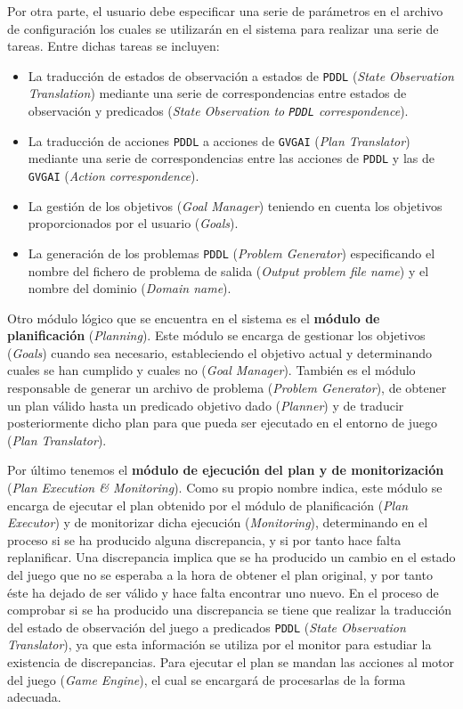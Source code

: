 Por otra parte, el usuario debe especificar una serie de parámetros en el archivo de
configuración los cuales se utilizarán en el sistema para realizar una serie de tareas.
Entre dichas tareas se incluyen:

\begin{itemize}[label=\textbullet]
    \item La traducción de estados de observación a estados de \texttt{PDDL}
    (\textit{State Observation Translation}) mediante una serie de correspondencias entre
    estados de observación y predicados (\textit{State Observation to \texttt{PDDL} correspondence}).
    \item La traducción de acciones \texttt{PDDL} a acciones de \texttt{GVGAI}
    (\textit{Plan Translator}) mediante una serie de correspondencias entre las acciones de
    \texttt{PDDL} y las de \texttt{GVGAI} (\textit{Action correspondence}).
    \item La gestión de los objetivos (\textit{Goal Manager}) teniendo en cuenta los
    objetivos proporcionados por el usuario (\textit{Goals}).
    \item La generación de los problemas \texttt{PDDL} (\textit{Problem Generator})
    especificando el nombre del fichero de problema de salida (\textit{Output problem file name})
    y el nombre del dominio (\textit{Domain name}).
\end{itemize}


Otro módulo lógico que se encuentra en el sistema es el \textbf{módulo de planificación}
(\textit{Planning}). Este módulo se encarga de gestionar los objetivos (\textit{Goals}) cuando
sea necesario, estableciendo el objetivo actual y determinando cuales se han cumplido y cuales no
(\textit{Goal Manager}). También es el módulo responsable de generar un archivo de problema
(\textit{Problem Generator}), de obtener un plan válido hasta un predicado objetivo dado
(\textit{Planner}) y de traducir posteriormente dicho plan para que pueda ser ejecutado
en el entorno de juego (\textit{Plan Translator}).

Por último tenemos el \textbf{módulo de ejecución del plan y de monitorización}
(\textit{Plan Execution \& Monitoring}). Como su propio nombre indica, este módulo
se encarga de ejecutar el plan obtenido por el módulo de planificación (\textit{Plan Executor})
y de monitorizar dicha ejecución (\textit{Monitoring}), determinando en el proceso si se ha
producido alguna discrepancia, y si por tanto hace falta replanificar. Una discrepancia implica
que se ha producido un cambio en el estado del juego que no se esperaba a la hora de obtener
el plan original, y por tanto éste ha dejado de ser válido y hace falta encontrar uno nuevo.
En el proceso de comprobar si se ha producido una discrepancia se tiene que realizar la traducción del
estado de observación del juego a predicados \texttt{PDDL} (\textit{State Observation Translator}),
ya que esta información se utiliza por el monitor para estudiar la existencia de discrepancias.
Para ejecutar el plan se mandan las acciones al motor del juego (\textit{Game Engine}), el cual
se encargará de procesarlas de la forma adecuada.

